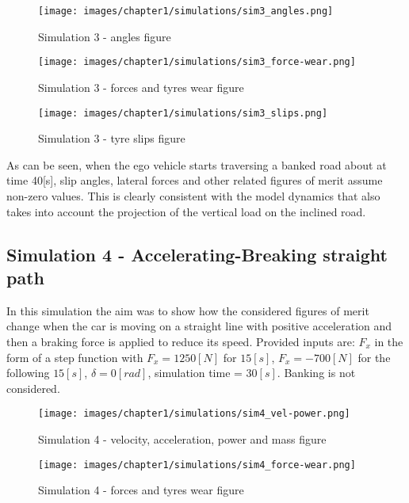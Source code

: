\documentclass{report}
\let\Oldsubsection\subsection
\renewcommand{\subsection}{\FloatBarrier\Oldsubsection}
\begin{document}
\begin{figure}[h!]
    \centering
    \texttt{[image: images/chapter1/simulations/sim3\_angles.png]}
    \caption{Simulation 3 - angles figure}
    \label{fig:sim3_2}
\end{figure}

\begin{figure}[h!]
    \centering
    \texttt{[image: images/chapter1/simulations/sim3\_force-wear.png]}
    \caption{Simulation 3 - forces and tyres wear figure}
    \label{fig:sim3_3}
\end{figure}

\begin{figure}[h!]
    \centering
    \texttt{[image: images/chapter1/simulations/sim3\_slips.png]}
    \caption{Simulation 3 - tyre slips figure}
    \label{fig:sim3_4}
\end{figure}

As can be seen, when the ego vehicle starts traversing a banked road about at time 40[s], slip angles, lateral forces and other related figures of merit assume non-zero values. This is clearly consistent with the model dynamics that also takes into account the projection of the vertical load on the inclined road.\\


\subsection{Simulation 4 - Accelerating-Breaking straight path}
In this simulation the aim was to show how the considered figures of merit change when the car is moving on a straight line with positive acceleration and then a braking force is applied to reduce its speed. Provided inputs are: $F_x$ in the form of a step function with $F_x = 1250 [N]$ for $15[s]$, $F_x = -700 [N]$ for the following $15[s]$, $\delta = 0 [rad]$, simulation time = $30 [s]$. Banking is not considered.

\begin{figure}[h!]
    \centering
    \texttt{[image: images/chapter1/simulations/sim4\_vel-power.png]}
    \caption{Simulation 4 - velocity, acceleration, power and mass figure}
    \label{fig:sim4_1}
\end{figure}

\begin{figure}[h!]
    \centering
    \texttt{[image: images/chapter1/simulations/sim4\_force-wear.png]}
    \caption{Simulation 4 - forces and tyres wear figure}
    \label{fig:sim4_2}
\end{figure}
\end{document}
